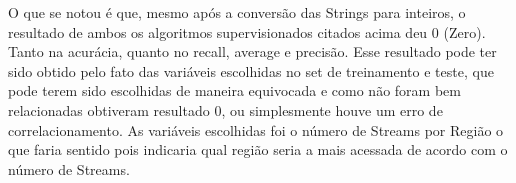 \documentclass[11pt]{article}
\newenvironment{Shaded}{}{}
\newcommand{\DecValTok}[1]{\textcolor[rgb]{0.25,0.63,0.44}{{#1}}}
\newcommand{\StringTok}[1]{\textcolor[rgb]{0.25,0.44,0.63}{{#1}}}
\newcommand{\CommentTok}[1]{\textcolor[rgb]{0.38,0.63,0.69}{\textit{{#1}}}}
\newcommand{\NormalTok}[1]{{#1}}
\newcommand{\SpecialCharTok}[1]{\textcolor[rgb]{0.25,0.44,0.63}{{#1}}}
\newcommand{\ImportTok}[1]{{#1}}
\newcommand{\VariableTok}[1]{\textcolor[rgb]{0.10,0.09,0.49}{{#1}}}
\newcommand{\OperatorTok}[1]{\textcolor[rgb]{0.40,0.40,0.40}{{#1}}}
\newcommand{\BuiltInTok}[1]{{#1}}
\begin{document}
    \begin{Shaded}
\end{Shaded}

    \begin{Shaded}
\end{Shaded}

    O que se notou é que, mesmo após a conversão das Strings para inteiros,
o resultado de ambos os algoritmos supervisionados citados acima deu 0
(Zero). Tanto na acurácia, quanto no recall, average e precisão. Esse
resultado pode ter sido obtido pelo fato das variáveis escolhidas no set
de treinamento e teste, que pode terem sido escolhidas de maneira
equivocada e como não foram bem relacionadas obtiveram resultado 0, ou
simplesmente houve um erro de correlacionamento. As variáveis escolhidas
foi o número de Streams por Região o que faria sentido pois indicaria
qual região seria a mais acessada de acordo com o número de Streams.
\end{document}
